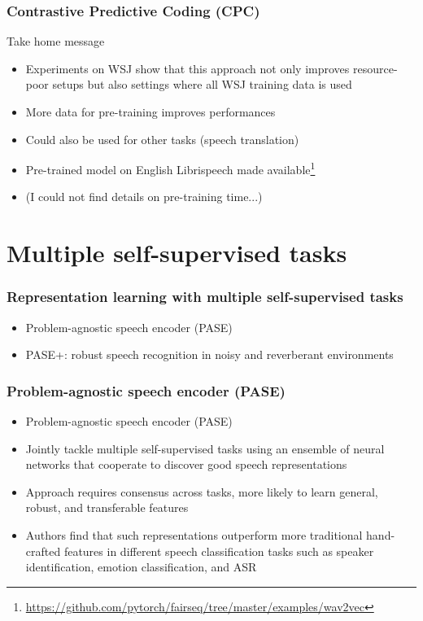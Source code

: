 \documentclass[table]{beamer}
\begin{document}
\begin{frame}
	\frametitle{Contrastive Predictive Coding (CPC)}
	Take home message
		\begin{itemize}
			\item Experiments on WSJ show that this approach not only improves resource-poor setups but also settings where all WSJ training data is used
			\item More data for pre-training improves performances
			\item Could also be  used for other tasks (speech translation)
			\item Pre-trained model on English Librispeech made available\footnote{\url{https://github.com/pytorch/fairseq/tree/master/examples/wav2vec}}
			\item (I could not find details on pre-training time...)
		\end{itemize} 


	
\end{frame}






\section{Multiple self-supervised tasks}


\begin{frame}
\frametitle{Representation learning with multiple self-supervised tasks}
\begin{itemize}
\item Problem-agnostic speech encoder (PASE) \citep{pascual2019}
\item PASE+:  robust speech recognition in noisy and reverberant environments \citep{ravanelli2020multitask}
\end{itemize} 
\end{frame}


\begin{frame}
\frametitle{Problem-agnostic speech encoder (PASE)}
\begin{itemize}
\item Problem-agnostic speech encoder (PASE) \citep{pascual2019}
\item Jointly tackle multiple self-supervised tasks using an ensemble of neural networks that cooperate to discover good speech representations
\item Approach requires consensus across tasks, more likely to learn general, robust, and transferable features
\item Authors find that such representations outperform more traditional hand-crafted features in different speech classification tasks such as speaker identification, emotion classification, and  ASR
\end{itemize} 
\end{frame}
\end{document}
